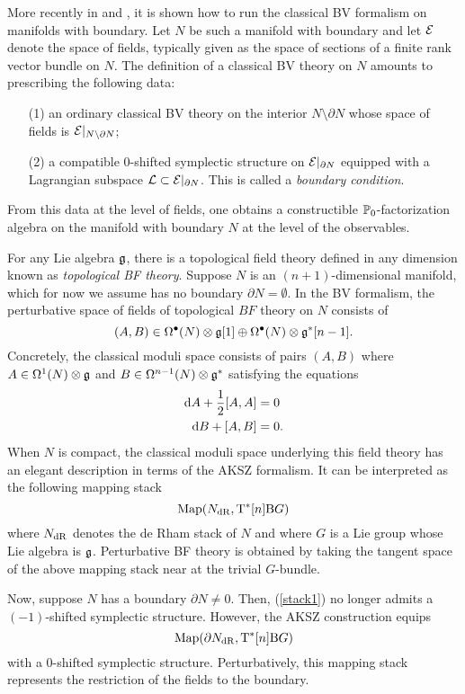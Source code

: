 \documentclass[11pt]{amsart}
\numberwithin{equation}{section}
\begin{document}
More recently in \cite{ButsonYoo} and \cite{Eugene}, it is shown how to run the classical BV formalism on manifolds with boundary. 
Let $N$ be such a manifold with boundary and let $\mathcal E$ denote the space of fields, typically given as the space of sections of a finite rank vector bundle on $N$. 
The definition of a classical BV theory on $N$ amounts to prescribing the following data:
\begin{itemize}
\item[(1)]
an ordinary classical BV theory on the interior $N \setminus \partial N$ whose space of fields is $\mathcal E|_{N \setminus \partial N}$;
\item[(2)] 
a compatible $0$-shifted symplectic structure on $\mathcal E|_{\partial N}$ equipped with a Lagrangian subspace $\mathcal L \subset \mathcal E|_{\partial N}$.
This is called a {\em boundary condition}.
\end{itemize}
From this data at the level of fields, one obtains a constructible $\mathbb P_0$-factorization algebra on the manifold with boundary $N$ at the level of the observables. 

For any Lie algebra $\mathfrak g$, there is a topological field theory defined in any dimension known as {\em topological BF theory}.
Suppose $N$ is an $(n+1)$-dimensional manifold, which for now we assume has no boundary $\partial N = \emptyset$. 
In the BV formalism, the perturbative space of fields of topological $BF$ theory on $N$ consists of
\[
(A, B) \in \Omega^{\bullet} (N) \otimes \mathfrak g [1] \oplus \Omega^{\bullet} (N) \otimes \mathfrak g^* [n-1] .
\]
Concretely, the classical moduli space consists of pairs $(A, B)$ where $A \in \Omega^1 (N) \otimes \mathfrak g$ and $B \in \Omega^{n-1} (N) \otimes \mathfrak g^*$ satisfying the equations
\begin{align*}
{\rm d} A + \frac12 [A,A] & = 0 \\
{\rm d} B + [A,B] & = 0 .
\end{align*}
When $N$ is compact, the classical moduli space underlying this field theory has an elegant description in terms of the AKSZ formalism. 
It can be interpreted as the following mapping stack 
\begin{equation} \label{stack1}
{\rm Map}(N_{\rm dR} ,  {\rm T}^*[n] {\rm B} G)
\end{equation}
where $N_{\rm dR}$ denotes the de Rham stack of $N$ and where $G$ is a Lie group whose Lie algebra is $\mathfrak g$. 
Perturbative BF theory is obtained by taking the tangent space of the above mapping stack near at the trivial $G$-bundle.

Now, suppose $N$ has a boundary $\partial N \ne 0$.
Then, (\ref{stack1}) no longer admits a $(-1)$-shifted symplectic structure. 
However, the AKSZ construction equips 
\[
{\rm Map}(\partial N_{\rm dR} , {\rm T}^* [n] {\rm B} G)
\]
with a $0$-shifted symplectic structure. 
Perturbatively, this mapping stack represents the restriction of the fields to the boundary. 
\end{document}
